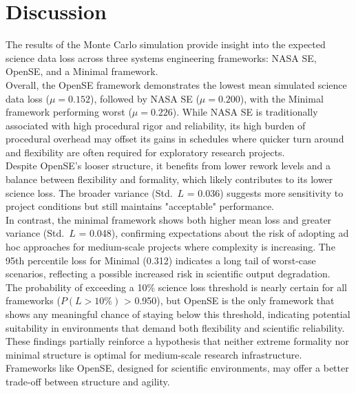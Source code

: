 \chapter{Discussion}
\label{chap:discussion}
The results of the Monte Carlo simulation provide insight into the expected science data loss across three systems engineering frameworks: NASA SE, OpenSE, and a Minimal framework.\\
Overall, the OpenSE framework demonstrates the lowest mean simulated science data loss ($\mu = 0.152$), followed by NASA SE ($\mu = 0.200$), with the Minimal framework performing worst ($\mu = 0.226$). While NASA SE is traditionally associated with high procedural rigor and reliability, its high burden of procedural overhead may offset its gains in schedules where quicker turn around and flexibility are often required for exploratory research projects.\\
Despite OpenSE’s looser structure, it benefits from lower rework levels and a balance between flexibility and formality, which likely contributes to its lower science loss. The broader variance (Std.\ $L$ = 0.036) suggests more sensitivity to project conditions but still maintains "acceptable" performance.\\
In contrast, the minimal framework shows both higher mean loss and greater variance (Std.\ $L$ = 0.048), confirming expectations about the risk of adopting ad hoc approaches for medium-scale projects where complexity is increasing. 
The 95th percentile loss for Minimal (0.312) indicates a long tail of worst-case scenarios, reflecting a possible increased risk in scientific output degradation.\\
The probability of exceeding a 10\% science loss threshold is nearly certain for all frameworks ($P(L > 10\%)$ > 0.950), but OpenSE is the only framework that shows any meaningful chance of staying below this threshold, indicating potential suitability in environments that demand both flexibility and scientific reliability.\\
These findings partially reinforce a hypothesis that neither extreme formality nor minimal structure is optimal for medium-scale research infrastructure.
Frameworks like OpenSE, designed for scientific environments, may offer a better trade-off between structure and agility.